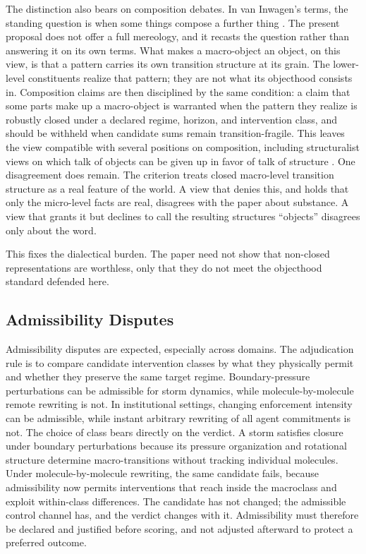 The distinction also bears on composition debates. In van Inwagen's terms, the standing question is
when some things compose a further thing \citep{vaninwagen1990}. The
present proposal does not offer a full mereology, and it recasts the
question rather than answering it on its own terms. What makes a
macro-object an object, on this view, is that a pattern carries its own
transition structure at its grain. The lower-level constituents realize
that pattern; they are not what its objecthood consists in. Composition
claims are then disciplined by the same condition: a claim that some
parts make up a macro-object is warranted when the pattern they realize
is robustly closed under a declared regime, horizon, and intervention
class, and should be withheld
when candidate sums remain transition-fragile. This leaves the view
compatible with several positions on composition, including
structuralist views on which talk of objects can be given up in favor
of talk of structure \citep{french2014}. One disagreement does remain.
The criterion treats closed macro-level transition structure as a real
feature of the world. A view that denies this, and holds that only the
micro-level facts are real, disagrees with the paper about substance. A
view that grants it but declines to call the resulting structures
``objects'' disagrees only about the word.

This fixes the dialectical burden. The paper need not show that
non-closed representations are worthless, only that they do not meet
the objecthood standard defended here.

\subsection{Admissibility Disputes}\label{admissibility-disputes}

Admissibility disputes are expected, especially across domains. The
adjudication rule is to compare candidate intervention classes by what
they physically permit and whether they preserve the same target regime.
Boundary-pressure perturbations can be admissible for storm dynamics,
while molecule-by-molecule remote rewriting is not. In institutional
settings, changing enforcement intensity can be admissible, while
instant arbitrary rewriting of all agent commitments is not. The choice
of class bears directly on the verdict. A storm satisfies closure under
boundary perturbations because its pressure organization and rotational
structure determine macro-transitions without tracking individual
molecules. Under molecule-by-molecule rewriting, the same candidate
fails, because admissibility now permits interventions that reach inside
the macroclass and exploit within-class differences. The candidate has
not changed; the admissible control channel has, and the verdict changes
with it. Admissibility must therefore be declared and justified before
scoring, and not adjusted afterward to protect a preferred outcome.

